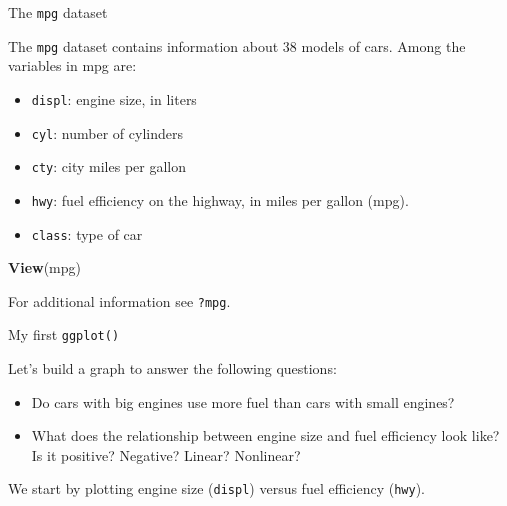 \documentclass[ignorenonframetext,]{beamer}
\newenvironment{Shaded}{\begin{snugshade}}{\end{snugshade}}
\newcommand{\KeywordTok}[1]{\textcolor[rgb]{0.13,0.29,0.53}{\textbf{#1}}}
\newcommand{\NormalTok}[1]{#1}
\begin{document}
\begin{frame}[fragile]{The \texttt{mpg} dataset}
\protect\hypertarget{the-mpg-dataset}{}

The \texttt{mpg} dataset contains information about 38 models of cars.
Among the variables in mpg are:

\begin{itemize}
\item
  \texttt{displ}: engine size, in liters
\item
  \texttt{cyl}: number of cylinders
\item
  \texttt{cty}: city miles per gallon
\item
  \texttt{hwy}: fuel efficiency on the highway, in miles per gallon
  (mpg).
\item
  \texttt{class}: type of car
\end{itemize}

\begin{Shaded}
\begin{Highlighting}[]
\KeywordTok{View}\NormalTok{(mpg)}
\end{Highlighting}
\end{Shaded}

For additional information see \texttt{?mpg}.

\end{frame}

\begin{frame}[fragile]{My first \texttt{ggplot()}}
\protect\hypertarget{my-first-ggplot}{}

Let's build a graph to answer the following questions:

\begin{itemize}
\item
  Do cars with big engines use more fuel than cars with small engines?
\item
  What does the relationship between engine size and fuel efficiency
  look like? Is it positive? Negative? Linear? Nonlinear?
\end{itemize}

We start by plotting engine size (\texttt{displ}) versus fuel efficiency
(\texttt{hwy}).

\end{frame}
\end{document}
